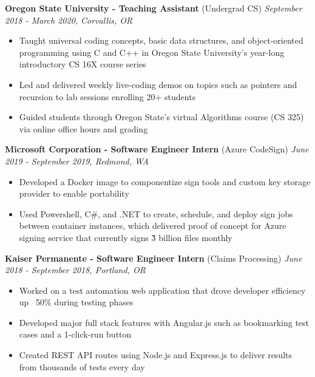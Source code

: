\documentclass{article}
\begin{document}
\vskip 0.1in

\noindent \normalsize \textbf{Oregon State University - Teaching Assistant} \footnotesize (Undergrad CS) \hfill \small \textit{September 2018 - March 2020, Corvallis, OR}
\begin{itemize}
\item Taught universal coding concepts, basic data structures, and object-oriented programming using C and C++ in Oregon State University’s year-long introductory CS 16X course series
\item Led and delivered weekly live-coding demos on topics such as pointers and recursion to lab sessions enrolling 20+ students
\item Guided students through Oregon State's virtual Algorithms course (CS 325) via online office hours and grading
\end{itemize}

\vskip 0.1in

\noindent \normalsize \textbf{Microsoft Corporation - Software Engineer Intern} \footnotesize (Azure CodeSign) \hfill \small \textit{June 2019 - September 2019, Redmond, WA}
\begin{itemize}
\item Developed a Docker image to componentize sign tools and custom key storage provider to enable portability
\item Used Powershell, C#, and .NET to create, schedule, and deploy sign jobs between container instances, which delivered proof of concept for Azure signing service that currently signs \~3 billion files monthly
\end{itemize}

\vskip 0.1in

\noindent \normalsize \textbf{Kaiser Permanente - Software Engineer Intern} \footnotesize (Claims Processing) \hfill \small \textit{June 2018 - September 2018, Portland, OR}
\begin{itemize}
\item Worked on a test automation web application that drove developer efficiency up ~50\% during testing phases
\item Developed major full stack features with Angular.js such as bookmarking test cases and a 1-click-run button
\item Created REST API routes using Node.js and Express.js to deliver results from thousands of tests every day
\end{itemize}

\vskip 0.1in
\end{document}
